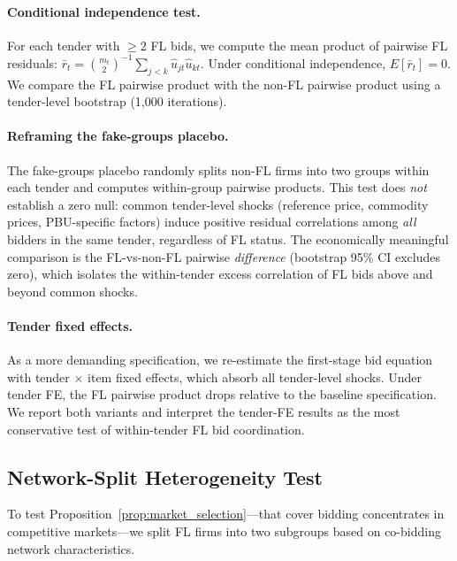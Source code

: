 \paragraph{Conditional independence test.}
For each tender with $\geq 2$ FL bids, we compute the mean product of
pairwise FL residuals:
$\bar{r}_t = \binom{m_t}{2}^{-1} \sum_{j < k}
\hat{u}_{jt} \hat{u}_{kt}$.
Under conditional independence, $E[\bar{r}_t] = 0$. We compare the FL
pairwise product with the non-FL pairwise product using a tender-level
bootstrap (1,000 iterations).

\paragraph{Reframing the fake-groups placebo.}
The fake-groups placebo randomly splits non-FL firms into two groups
within each tender and computes within-group pairwise products. This
test does \emph{not} establish a zero null: common tender-level shocks
(reference price, commodity prices, PBU-specific factors) induce
positive residual correlations among \emph{all} bidders in the same
tender, regardless of FL status. The economically meaningful comparison
is the FL-vs-non-FL pairwise \emph{difference} (bootstrap 95\% CI
excludes zero), which isolates the within-tender excess correlation of
FL bids above and beyond common shocks.

\paragraph{Tender fixed effects.}
As a more demanding specification, we re-estimate the first-stage bid
equation with tender $\times$ item fixed effects, which absorb all
tender-level shocks. Under tender FE, the FL pairwise product drops
relative to the baseline specification. We report both variants and
interpret the tender-FE results as the most conservative test of
within-tender FL bid coordination.


\subsection{Network-Split Heterogeneity Test} %
\label{sec:empirical_network}

To test Proposition~\ref{prop:market_selection}---that cover bidding
concentrates in competitive markets---we split FL firms into two
subgroups based on co-bidding network characteristics.

